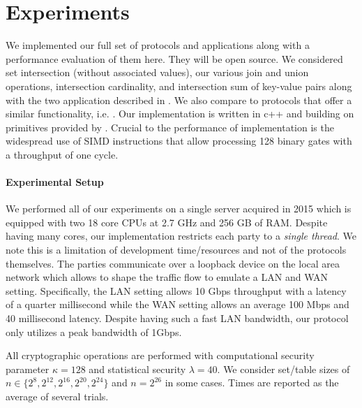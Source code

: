

\section{Experiments}\label{sec:eval}


We implemented our full set of protocols and applications along with a performance evaluation of them here. They will be open source. We considered set intersection (without associated values), our various join and union operations, intersection cardinality, and intersection sum of key-value pairs along with the two application described in . We also compare to protocols that offer a similar functionality, i.e. \cite{CCS:KKRT16, PSWW18,ASIACCS:BlaAgu12,DBLP:conf/cans/CristofaroGT12,cryptoeprint:2017:738}. Our implementation is written in c++ and building on primitives provided by \cite{libOTe}. Crucial to the performance of implementation is the widespread use of SIMD instructions that allow processing 128 binary gates with a throughput of one cycle.



\paragraph{Experimental Setup} We performed all of our experiments on a single server acquired in 2015 which is equipped with two 18 core CPUs at 2.7 GHz and 256 GB of RAM. Despite having many cores, our implementation restricts each party to a \emph{single thread}. We note this is a limitation of development time/resources and not of the protocols themselves. The parties communicate over a loopback device on the local area network which allows to shape the traffic flow to emulate a LAN and WAN setting. Specifically, the LAN setting allows 10 Gbps throughput with a latency of a quarter millisecond while the WAN setting allows an average 100 Mbps and 40 millisecond latency. Despite having such a fast LAN bandwidth, our protocol only utilizes a peak bandwidth of 1Gbps. 

All cryptographic operations are performed with computational security parameter $\kappa=128$ and statistical security $\lambda=40$. We consider set/table sizes of $n\in\{2^8, 2^{12}, 2^{16}, 2^{20}, 2^{24}\}$ and $n=2^{26}$ in some cases. Times are reported as the average of several trials.

